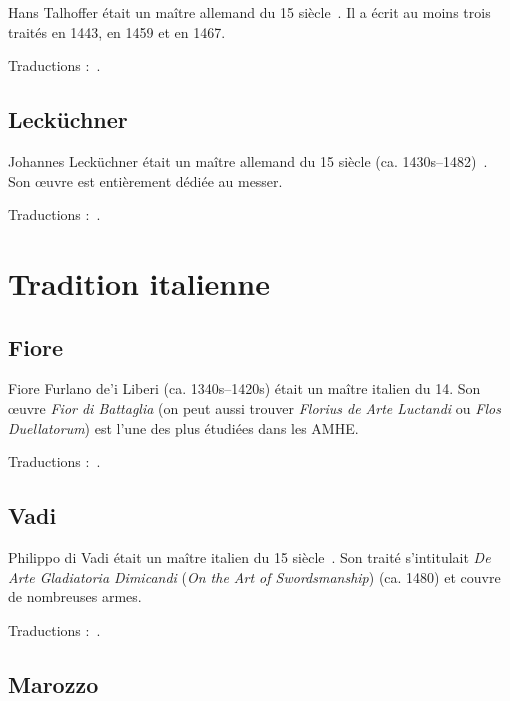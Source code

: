 Hans Talhoffer était un maître allemand du 15\ieme{} siècle~\cite{wiktenauer:talhoffer}.
Il a écrit au moins trois traités en 1443, en 1459 et en 1467.

Traductions :~\cite{gaurin:talhoffer:2005}.


\subsection{Lecküchner}
\label{app:maitres:lekuchner}

Johannes Lecküchner était un maître allemand du 15\ieme{} siècle (ca. 1430s–1482)~\cite{wiktenauer:leckuchner}.
Son œuvre est entièrement dédiée au messer.


Traductions :~\cite{ardamhe:leckuchner}.


\section{Tradition italienne}



\subsection{Fiore}
\label{app:maitres:fiore}

Fiore Furlano de'i Liberi (ca. 1340s–1420s) était un maître italien du 14\ieme{}.
Son œuvre \emph{Fior di Battaglia} (on peut aussi trouver \emph{Florius de Arte Luctandi} ou \emph{Flos Duellatorum}) est l'une des plus étudiées dans les AMHE.

Traductions :~\cite{conan:fiore, exiles:fiore:getty}.


\subsection{Vadi}
\label{app:maitres:vadi}

Philippo di Vadi était un maître italien du 15\ieme{} siècle~\cite{wiktenauer:vadi}.
Son traité s'intitulait \emph{De Arte Gladiatoria Dimicandi} (\emph{On the Art of Swordsmanship}) (ca. 1480) et couvre de nombreuses armes.

Traductions :~\cite{chaize:vadi, patrouix:vadi:2013, petit:vadi:longword}.


\subsection{Marozzo}
\label{app:maitres:marozzo}

